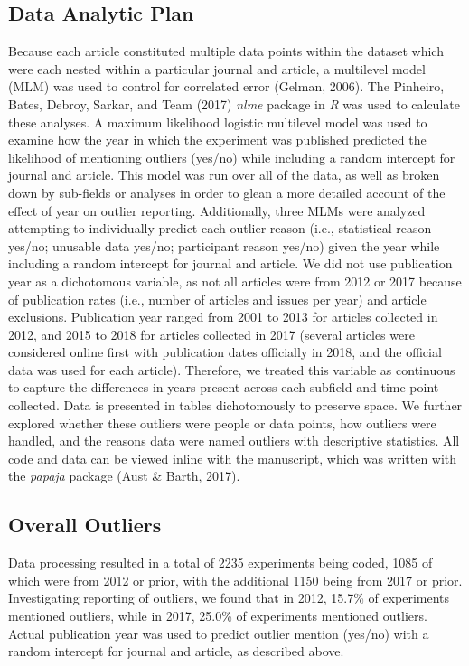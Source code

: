\documentclass[english,,man]{apa6}
\begin{document}
\hypertarget{data-analytic-plan}{%
\subsection{Data Analytic Plan}\label{data-analytic-plan}}

Because each article constituted multiple data points within the dataset which were each nested within a particular journal and article, a multilevel model (MLM) was used to control for correlated error (Gelman, 2006). The Pinheiro, Bates, Debroy, Sarkar, and Team (2017) \emph{nlme} package in \emph{R} was used to calculate these analyses. A maximum likelihood logistic multilevel model was used to examine how the year in which the experiment was published predicted the likelihood of mentioning outliers (yes/no) while including a random intercept for journal and article. This model was run over all of the data, as well as broken down by sub-fields or analyses in order to glean a more detailed account of the effect of year on outlier reporting. Additionally, three MLMs were analyzed attempting to individually predict each outlier reason (i.e., statistical reason yes/no; unusable data yes/no; participant reason yes/no) given the year while including a random intercept for journal and article. We did not use publication year as a dichotomous variable, as not all articles were from 2012 or 2017 because of publication rates (i.e., number of articles and issues per year) and article exclusions. Publication year ranged from 2001 to 2013 for articles collected in 2012, and 2015 to 2018 for articles collected in 2017 (several articles were considered online first with publication dates officially in 2018, and the official data was used for each article). Therefore, we treated this variable as continuous to capture the differences in years present across each subfield and time point collected. Data is presented in tables dichotomously to preserve space. We further explored whether these outliers were people or data points, how outliers were handled, and the reasons data were named outliers with descriptive statistics. All code and data can be viewed inline with the manuscript, which was written with the \emph{papaja} package (Aust \& Barth, 2017).

\hypertarget{overall-outliers}{%
\subsection{Overall Outliers}\label{overall-outliers}}

Data processing resulted in a total of 2235 experiments being coded, 1085 of which were from 2012 or prior, with the additional 1150 being from 2017 or prior. Investigating reporting of outliers, we found that in 2012, 15.7\% of experiments mentioned outliers, while in 2017, 25.0\% of experiments mentioned outliers. Actual publication year was used to predict outlier mention (yes/no) with a random intercept for journal and article, as described above.
\end{document}
